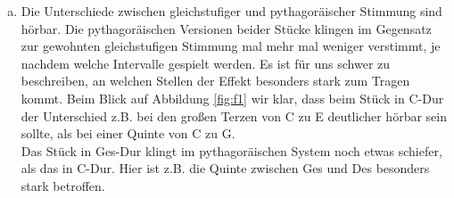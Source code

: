 \begin{enumerate}[a)]
\item
Die Unterschiede zwischen gleichstufiger und pythagoräischer Stimmung sind hörbar. Die pythagoräischen Versionen beider Stücke klingen im Gegensatz zur gewohnten gleichstufigen Stimmung mal mehr mal weniger verstimmt, je nachdem welche Intervalle gespielt werden. Es ist für uns schwer zu beschreiben, an welchen Stellen der Effekt besonders stark zum Tragen kommt. Beim Blick auf Abbildung \ref{fig:f1} wir klar, dass beim Stück in C-Dur der Unterschied z.B. bei den großen Terzen von C zu E deutlicher hörbar sein sollte, als bei einer Quinte von C zu G. \\
Das Stück in Ges-Dur klingt im pythagoräischen System noch etwas schiefer, als das in C-Dur. Hier ist z.B. die Quinte zwischen Ges und Des besonders stark betroffen.\\ 
\end{enumerate}
